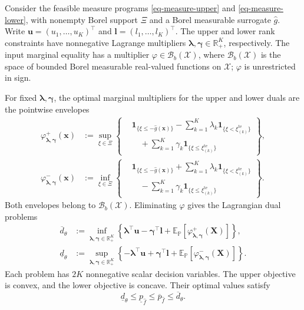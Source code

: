 \begin{lemma}
  \label{lem-weak-duality}
  Consider the feasible measure programs \eqref{eq-measure-upper} and \eqref{eq-measure-lower}, with nonempty Borel support $\Xi$ and a Borel measurable surrogate $\hat g$. Write $\bm u=(u_1,\ldots,u_K)^\top$ and $\bm l=(l_1,\ldots,l_K)^\top$. The upper and lower rank constraints have nonnegative Lagrange multipliers $\bm\lambda,\bm\gamma\in\mathbb R_+^K$, respectively. The input marginal equality has a multiplier $\varphi\in\mathcal B_b(\mathcal X)$, where $\mathcal B_b(\mathcal X)$ is the space of bounded Borel measurable real-valued functions on $\mathcal X$; $\varphi$ is unrestricted in sign.

  For fixed $\bm\lambda,\bm\gamma$, the optimal marginal multipliers for the upper and lower duals are the pointwise envelopes
  \begin{align}
    \varphi^+_{\bm\lambda,\bm\gamma}(\bm x)
    &:=\sup_{\xi\in\Xi}\left\{
      \begin{aligned}
        &\mathbf1_{\{\xi\le-\hat g(\bm x)\}}
        -\sum_{k=1}^K\lambda_k\mathbf1_{\{\xi<\xi_{(k)}^{\mathrm{te}}\}}\\
        &\quad+\sum_{k=1}^K\gamma_k\mathbf1_{\{\xi\le\xi_{(k)}^{\mathrm{te}}\}}
      \end{aligned}\right\},
    \label{eq-upper-marginal-envelope}\\
    \varphi^-_{\bm\lambda,\bm\gamma}(\bm x)
    &:=\inf_{\xi\in\Xi}\left\{
      \begin{aligned}
        &\mathbf1_{\{\xi\le-\hat g(\bm x)\}}
        +\sum_{k=1}^K\lambda_k\mathbf1_{\{\xi<\xi_{(k)}^{\mathrm{te}}\}}\\
        &\quad-\sum_{k=1}^K\gamma_k\mathbf1_{\{\xi\le\xi_{(k)}^{\mathrm{te}}\}}
      \end{aligned}\right\}.
    \label{eq-lower-marginal-envelope}
  \end{align}
  Both envelopes belong to $\mathcal B_b(\mathcal X)$. Eliminating $\varphi$ gives the Lagrangian dual problems
  \begin{align}
    \overline d_\theta
    &:=\inf_{\bm\lambda,\bm\gamma\in\mathbb R_+^K}
      \left\{\bm\lambda^\top\bm u-\bm\gamma^\top\bm l
      +\mathbb E_{\mathbb P}\left[\varphi^+_{\bm\lambda,\bm\gamma}(\bm X)\right]\right\},
    \label{eq-upper-measure-dual}\\
    \underline d_\theta
    &:=\sup_{\bm\lambda,\bm\gamma\in\mathbb R_+^K}
      \left\{-\bm\lambda^\top\bm u+\bm\gamma^\top\bm l
      +\mathbb E_{\mathbb P}\left[\varphi^-_{\bm\lambda,\bm\gamma}(\bm X)\right]\right\}.
    \label{eq-lower-measure-dual}
  \end{align}
  Each problem has $2K$ nonnegative scalar decision variables. The upper objective is convex, and the lower objective is concave. Their optimal values satisfy
  \begin{equation}
    \underline d_\theta\le\underline p_{\hat f}
    \le\overline p_{\hat f}\le\overline d_\theta.
    \label{eq-weak-duality}
  \end{equation}
\end{lemma}
